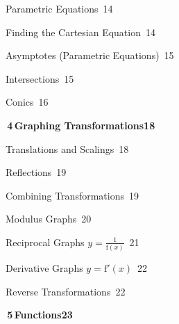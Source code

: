 \documentclass[a4paper,openany]{book}
\begin{document}
{\noindent{}\quad Parametric Equations\dotfill\ 14\par
\noindent{}\quad Finding the Cartesian Equation\dotfill\ 14\par
\noindent{}\quad Asymptotes (Parametric Equations)\dotfill\ 15\par
\noindent{}\quad Intersections\dotfill\ 15\par
\noindent{}\quad Conics\dotfill\ 16\par
\medskip\noindent\colorbox{blue!8}{\parbox{\dimexpr\textwidth-2\fboxsep}{\large\bfseries\color{blue!50!black}\colorbox{blue!50!black}{\color{white}\,4\,}\quad Graphing Transformations\hfill 18}}\par\nopagebreak\smallskip\nopagebreak
\noindent{}\quad Translations and Scalings\dotfill\ 18\par
\noindent{}\quad Reflections\dotfill\ 19\par
\noindent{}\quad Combining Transformations\dotfill\ 19\par
\noindent{}\quad Modulus Graphs\dotfill\ 20\par
\noindent{}\quad Reciprocal Graphs $y=\frac {1}{\mathrm {f}(x)}$\dotfill\ 21\par
\noindent{}\quad Derivative Graphs $y=\mathrm {f}'(x)$\dotfill\ 22\par
\noindent{}\quad Reverse Transformations\dotfill\ 22\par
\medskip\noindent\colorbox{blue!8}{\parbox{\dimexpr\textwidth-2\fboxsep}{\large\bfseries\color{blue!50!black}\colorbox{blue!50!black}{\color{white}\,5\,}\quad Functions\hfill 23}}\par\nopagebreak\smallskip\nopagebreak
}
\end{document}
